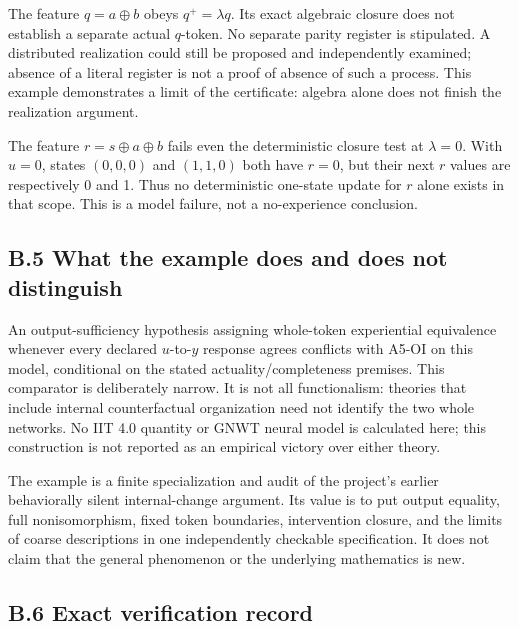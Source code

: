 \documentclass[
  11pt,
  a4paper,
]{article}
\begin{document}
The feature \(q=a\oplus b\) obeys \(q^+=\lambda q\). Its exact algebraic
closure does not establish a separate actual \(q\)-token. No separate
parity register is stipulated. A distributed realization could still be
proposed and independently examined; absence of a literal register is
not a proof of absence of such a process. This example demonstrates a
limit of the certificate: algebra alone does not finish the realization
argument.

The feature \(r=s\oplus a\oplus b\) fails even the deterministic closure
test at \(\lambda=0\). With \(u=0\), states \((0,0,0)\) and \((1,1,0)\)
both have \(r=0\), but their next \(r\) values are respectively 0 and 1.
Thus no deterministic one-state update for \(r\) alone exists in that
scope. This is a model failure, not a no-experience conclusion.

\hypertarget{b.5-what-the-example-does-and-does-not-distinguish}{%
\subsection{B.5 What the example does and does not
distinguish}\label{b.5-what-the-example-does-and-does-not-distinguish}}

An output-sufficiency hypothesis assigning whole-token experiential
equivalence whenever every declared \(u\)-to-\(y\) response agrees
conflicts with A5-OI on this model, conditional on the stated
actuality/completeness premises. This comparator is deliberately narrow.
It is not all functionalism: theories that include internal
counterfactual organization need not identify the two whole networks. No
IIT 4.0 quantity or GNWT neural model is calculated here; this
construction is not reported as an empirical victory over either theory.

The example is a finite specialization and audit of the project's
earlier behaviorally silent internal-change argument. Its value is to
put output equality, full nonisomorphism, fixed token boundaries,
intervention closure, and the limits of coarse descriptions in one
independently checkable specification. It does not claim that the
general phenomenon or the underlying mathematics is new.

\hypertarget{b.6-exact-verification-record}{%
\subsection{B.6 Exact verification
record}\label{b.6-exact-verification-record}}
\end{document}
